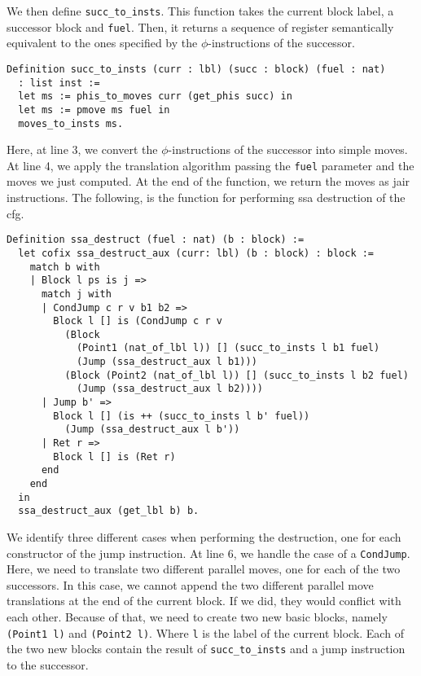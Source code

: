 We then define \texttt{succ\_to\_insts}. This function takes the current block label, a successor block and \texttt{fuel}. Then, it returns a sequence of register semantically equivalent to the ones specified by the $\phi$-instructions of the successor.

\begin{lstlisting}[style=Rocq]
Definition succ_to_insts (curr : lbl) (succ : block) (fuel : nat)
  : list inst :=
  let ms := phis_to_moves curr (get_phis succ) in
  let ms := pmove ms fuel in
  moves_to_insts ms.
\end{lstlisting}

Here, at line 3, we convert the $\phi$-instructions of the successor into simple moves. At line 4, we apply the translation algorithm passing the \texttt{fuel} parameter and the moves we just computed. At the end of the function, we return the moves as \gls{jair} instructions.
The following, is the function for performing \gls{ssa} destruction of the \gls{cfg}.

\begin{lstlisting}[style=Rocq]
Definition ssa_destruct (fuel : nat) (b : block) :=
  let cofix ssa_destruct_aux (curr: lbl) (b : block) : block :=
    match b with
    | Block l ps is j =>
      match j with
      | CondJump c r v b1 b2 =>
        Block l [] is (CondJump c r v
          (Block
            (Point1 (nat_of_lbl l)) [] (succ_to_insts l b1 fuel)
            (Jump (ssa_destruct_aux l b1)))
          (Block (Point2 (nat_of_lbl l)) [] (succ_to_insts l b2 fuel)
            (Jump (ssa_destruct_aux l b2))))
      | Jump b' =>
        Block l [] (is ++ (succ_to_insts l b' fuel))
          (Jump (ssa_destruct_aux l b'))
      | Ret r =>
        Block l [] is (Ret r)
      end
    end
  in
  ssa_destruct_aux (get_lbl b) b.
\end{lstlisting}

We identify three different cases when performing the destruction, one for each constructor of the jump instruction. At line 6, we handle the case of a \texttt{CondJump}. Here, we need to translate two different parallel moves, one for each of the two successors. In this case, we cannot append the two different parallel move translations at the end of the current block. If we did, they would conflict with each other. Because of that, we need to create two new basic blocks, namely \texttt{(Point1 l)} and \texttt{(Point2 l)}. Where \texttt l is the label of the current block. Each of the two new blocks contain the result of \texttt{succ\_to\_insts} and a jump instruction to the successor.

